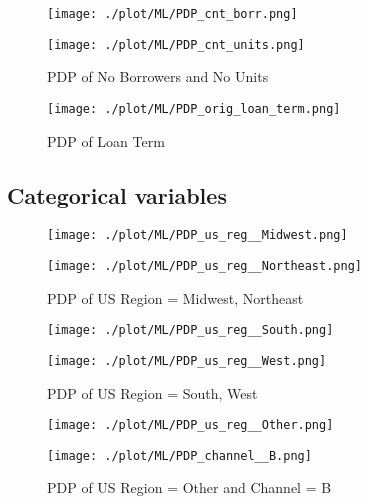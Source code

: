 \begin{figure}[H]
\begin{minipage}{.5\textwidth}
	\centering
	\texttt{[image: ./plot/ML/PDP\_cnt\_borr.png]}
\end{minipage}%
\begin{minipage}{.5\textwidth}
	\centering
	\texttt{[image: ./plot/ML/PDP\_cnt\_units.png]}
\end{minipage}
    \caption{PDP of No Borrowers and No Units}
\end{figure}

\begin{figure}[H]
	\centering
	\texttt{[image: ./plot/ML/PDP\_orig\_loan\_term.png]}
    \caption{PDP of Loan Term}
\end{figure}

\subsection{Categorical variables}

\begin{figure}[H]
\begin{minipage}{.5\textwidth}
	\centering
	\texttt{[image: ./plot/ML/PDP\_us\_reg\_\_Midwest.png]}
\end{minipage}%
\begin{minipage}{.5\textwidth}
	\centering
	\texttt{[image: ./plot/ML/PDP\_us\_reg\_\_Northeast.png]}
\end{minipage}
    \caption{PDP of US Region = Midwest, Northeast}
\end{figure}

\begin{figure}[H]
\begin{minipage}{.5\textwidth}
	\centering
	\texttt{[image: ./plot/ML/PDP\_us\_reg\_\_South.png]}
\end{minipage}%
\begin{minipage}{.5\textwidth}
	\centering
	\texttt{[image: ./plot/ML/PDP\_us\_reg\_\_West.png]}
\end{minipage}
    \caption{PDP of US Region = South, West}
\end{figure}

\begin{figure}[H]
\begin{minipage}{.5\textwidth}
	\centering
	\texttt{[image: ./plot/ML/PDP\_us\_reg\_\_Other.png]}
\end{minipage}%
\begin{minipage}{.5\textwidth}
	\centering
	\texttt{[image: ./plot/ML/PDP\_channel\_\_B.png]}
\end{minipage}
    \caption{PDP of US Region = Other and Channel = B}
\end{figure}

